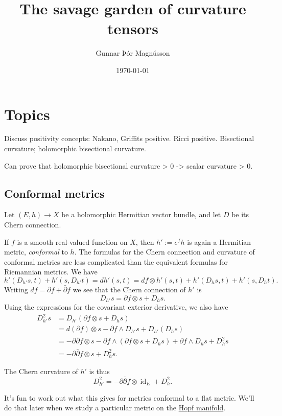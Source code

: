 \documentclass[11pt]{article}
\author{Gunnar Þór Magnússon}
\date{\today}
\title{The savage garden of curvature tensors}
\DeclareMathOperator{\id}{id}
\begin{document}
\maketitle
\tableofcontents



\section{Topics}
\label{sec:org093d592}

Discuss positivity concepts: Nakano, Griffits positive. Ricci positive. Bisectional curvature; holomorphic bisectional curvature.

Can prove that holomorphic bisectional curvature > 0 -> scalar curvature > 0.

\subsection{Conformal metrics}
\label{sec:org65fcbad}

Let \((E,h) \to X\) be a holomorphic Hermitian vector bundle, and let \(D\) be its Chern connection.

If \(f\) is a smooth real-valued function on \(X\), then \(h' := e^f h\) is again a Hermitian metric, \emph{conformal} to \(h\). The formulas for the Chern connection and curvature of conformal metrics are less complicated than the equivalent formulas for Riemannian metrics. We have
$$
h'(D_{h'} s, t) + h'(s, D_{h'} t)
= d h'(s, t)
= df \otimes h'(s, t) + h'(D_h s, t) + h'(s, D_h t).
$$
Writing \(df = \partial f + \bar\partial f\) we see that the Chern connection of \(h'\) is
$$
D_{h'} s = \partial f \otimes s + D_h s.
$$
Using the expressions for the covariant exterior derivative, we also have
\begin{align*}
D_{h'}^2 s
&= D_{h'}(\partial f \otimes s + D_h s)
\\
&= d(\partial f) \otimes s - \partial f \wedge D_{h'} s + D_{h'}(D_h s)
\\
&= -\partial\bar\partial f \otimes s - \partial f \wedge (\partial f \otimes s + D_h s) + \partial f \wedge D_h s + D_h^2 s
\\
&= -\partial\bar\partial f \otimes s + D_h^2 s.
\end{align*}

The Chern curvature of \(h'\) is thus
$$
D^2_{h'} = -\partial\bar\partial f \otimes \id_E + D^2_h.
$$

It's fun to work out what this gives for metrics conformal to a flat metric. We'll do that later when we study a particular metric on the \hyperref[sec:org8f5818e]{Hopf manifold}.
\end{document}

